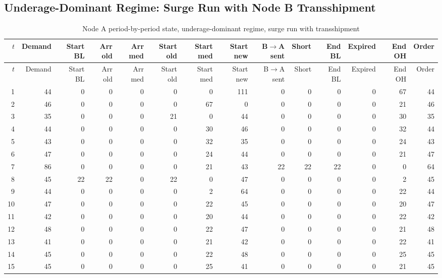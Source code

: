 \documentclass[11pt]{article}
\begin{document}
\begin{landscape}
\scriptsize
\setlength\LTleft{0pt}
\setlength\LTright{0pt}

\subsection{Underage-Dominant Regime: Surge Run with Node B Transshipment}

\begin{longtable}{rrrrrrrrrrrrrr}
\caption{Node A period-by-period state, underage-dominant regime, surge run with transshipment}\label{tab:appendix-underage-a}\\
\toprule
$t$ & Demand & Start BL & Arr old & Arr med & Start old & Start med & Start new & B$\rightarrow$A sent & Short & End BL & Expired & End OH & Order \\
\midrule
\endfirsthead
\toprule
$t$ & Demand & Start BL & Arr old & Arr med & Start old & Start med & Start new & B$\rightarrow$A sent & Short & End BL & Expired & End OH & Order \\
\midrule
\endhead
1 & 44 & 0 & 0 & 0 & 0 & 0 & 111 & 0 & 0 & 0 & 0 & 67 & 44 \\
2 & 46 & 0 & 0 & 0 & 0 & 67 & 0 & 0 & 0 & 0 & 0 & 21 & 46 \\
3 & 35 & 0 & 0 & 0 & 21 & 0 & 44 & 0 & 0 & 0 & 0 & 30 & 35 \\
4 & 44 & 0 & 0 & 0 & 0 & 30 & 46 & 0 & 0 & 0 & 0 & 32 & 44 \\
5 & 43 & 0 & 0 & 0 & 0 & 32 & 35 & 0 & 0 & 0 & 0 & 24 & 43 \\
6 & 47 & 0 & 0 & 0 & 0 & 24 & 44 & 0 & 0 & 0 & 0 & 21 & 47 \\
7 & 86 & 0 & 0 & 0 & 0 & 21 & 43 & 22 & 22 & 22 & 0 & 0 & 64 \\
8 & 45 & 22 & 22 & 0 & 22 & 0 & 47 & 0 & 0 & 0 & 0 & 2 & 45 \\
9 & 44 & 0 & 0 & 0 & 0 & 2 & 64 & 0 & 0 & 0 & 0 & 22 & 44 \\
10 & 47 & 0 & 0 & 0 & 0 & 22 & 45 & 0 & 0 & 0 & 0 & 20 & 47 \\
11 & 42 & 0 & 0 & 0 & 0 & 20 & 44 & 0 & 0 & 0 & 0 & 22 & 42 \\
12 & 48 & 0 & 0 & 0 & 0 & 22 & 47 & 0 & 0 & 0 & 0 & 21 & 48 \\
13 & 41 & 0 & 0 & 0 & 0 & 21 & 42 & 0 & 0 & 0 & 0 & 22 & 41 \\
14 & 45 & 0 & 0 & 0 & 0 & 22 & 48 & 0 & 0 & 0 & 0 & 25 & 45 \\
15 & 45 & 0 & 0 & 0 & 0 & 25 & 41 & 0 & 0 & 0 & 0 & 21 & 45 \\
\bottomrule
\end{longtable}


\end{landscape}
\end{document}
